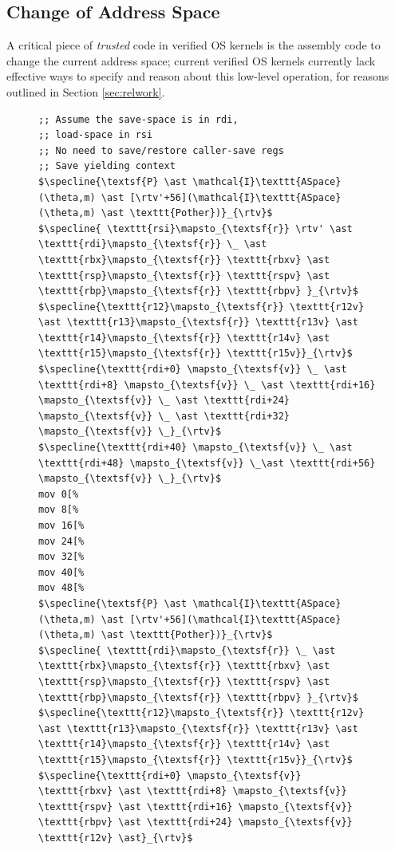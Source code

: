 \documentclass[acmsmall,screen,nonacm]{acmart}
\begin{document}
\subsection{Change of Address Space}
A critical piece of \emph{trusted} code in verified OS kernels is the assembly code to change the current address space; current verified OS kernels currently lack effective ways to specify and reason about this low-level operation, for reasons outlined in Section \ref{sec:relwork}.
\begin{figure}\footnotesize
\begin{lstlisting}
;; Assume the save-space is in rdi,
;; load-space in rsi
;; No need to save/restore caller-save regs
;; Save yielding context
$\specline{\textsf{P} \ast \mathcal{I}\texttt{ASpace}(\theta,m) \ast [\rtv'+56](\mathcal{I}\texttt{ASpace}(\theta,m) \ast \texttt{Pother})}_{\rtv}$
$\specline{ \texttt{rsi}\mapsto_{\textsf{r}} \rtv' \ast \texttt{rdi}\mapsto_{\textsf{r}} \_ \ast \texttt{rbx}\mapsto_{\textsf{r}} \texttt{rbxv} \ast  \texttt{rsp}\mapsto_{\textsf{r}} \texttt{rspv} \ast \texttt{rbp}\mapsto_{\textsf{r}} \texttt{rbpv} }_{\rtv}$
$\specline{\texttt{r12}\mapsto_{\textsf{r}} \texttt{r12v} \ast \texttt{r13}\mapsto_{\textsf{r}} \texttt{r13v} \ast \texttt{r14}\mapsto_{\textsf{r}} \texttt{r14v} \ast \texttt{r15}\mapsto_{\textsf{r}} \texttt{r15v}}_{\rtv}$
$\specline{\texttt{rdi+0} \mapsto_{\textsf{v}} \_ \ast \texttt{rdi+8} \mapsto_{\textsf{v}} \_ \ast \texttt{rdi+16} \mapsto_{\textsf{v}} \_ \ast \texttt{rdi+24} \mapsto_{\textsf{v}} \_ \ast \texttt{rdi+32} \mapsto_{\textsf{v}} \_}_{\rtv}$
$\specline{\texttt{rdi+40} \mapsto_{\textsf{v}} \_ \ast \texttt{rdi+48} \mapsto_{\textsf{v}} \_\ast \texttt{rdi+56} \mapsto_{\textsf{v}} \_}_{\rtv}$
mov 0[%
mov 8[%
mov 16[%
mov 24[%
mov 32[%
mov 40[%
mov 48[%
$\specline{\textsf{P} \ast \mathcal{I}\texttt{ASpace}(\theta,m) \ast [\rtv'+56](\mathcal{I}\texttt{ASpace}(\theta,m) \ast \texttt{Pother})}_{\rtv}$
$\specline{ \texttt{rdi}\mapsto_{\textsf{r}} \_ \ast \texttt{rbx}\mapsto_{\textsf{r}} \texttt{rbxv} \ast  \texttt{rsp}\mapsto_{\textsf{r}} \texttt{rspv} \ast \texttt{rbp}\mapsto_{\textsf{r}} \texttt{rbpv} }_{\rtv}$
$\specline{\texttt{r12}\mapsto_{\textsf{r}} \texttt{r12v} \ast \texttt{r13}\mapsto_{\textsf{r}} \texttt{r13v} \ast \texttt{r14}\mapsto_{\textsf{r}} \texttt{r14v} \ast \texttt{r15}\mapsto_{\textsf{r}} \texttt{r15v}}_{\rtv}$
$\specline{\texttt{rdi+0} \mapsto_{\textsf{v}} \texttt{rbxv} \ast \texttt{rdi+8} \mapsto_{\textsf{v}} \texttt{rspv} \ast \texttt{rdi+16} \mapsto_{\textsf{v}} \texttt{rbpv} \ast \texttt{rdi+24} \mapsto_{\textsf{v}} \texttt{r12v} \ast}_{\rtv}$

\end{lstlisting}
\end{figure}
\end{document}
